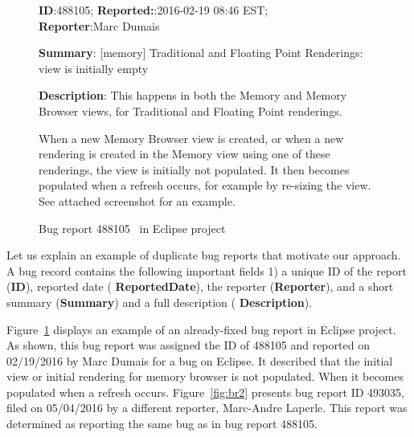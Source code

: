 \begin{figure}[t]
\sf
\small
\textbf{ID}:488105; \textbf{Reported:}:2016-02-19 08:46 EST; \\\textbf{Reporter}:Marc Dumais

\textbf{Summary}:  [memory] Traditional and Floating Point Renderings: view is initially empty

\textbf{Description}: This happens in both the Memory and Memory Browser views, for Traditional and Floating Point renderings. 

When a new Memory Browser view is created, or when a new rendering is created in the Memory view using one of these renderings, the view is initially not populated. It then becomes populated when a refresh occurs, for example by re-sizing the view. See attached screenshot for an example.
\rm
\caption{Bug report 488105~\cite{bug488105} in Eclipse project}
\label{fig:br1}
\end{figure}


Let us explain an example of duplicate bug reports that motivate our
approach.
A bug record contains the following important fields 1) a unique ID
of the report (\textbf{\sf ID}), reported date (\textbf{\sf
  ReportedDate}), the reporter (\textbf{\sf Reporter}), and a short
summary (\textbf{\sf Summary}) and a full description (\textbf{\sf
  Description}).

Figure~\ref{fig:br1} displays an example of an already-fixed bug
report in Eclipse project. As shown, this bug report was assigned the
ID of 488105 and reported on 02/19/2016 by Marc Dumais for a bug on
Eclipse. It described that the initial view or initial rendering for
memory browser is not populated. When it becomes populated when a
refresh occurs. Figure~\ref{fig:br2} presents bug report ID 493035,
filed on 05/04/2016 by a different reporter, Marc-Andre Laperle. This
report was determined as reporting the same bug as in bug report
488105.


